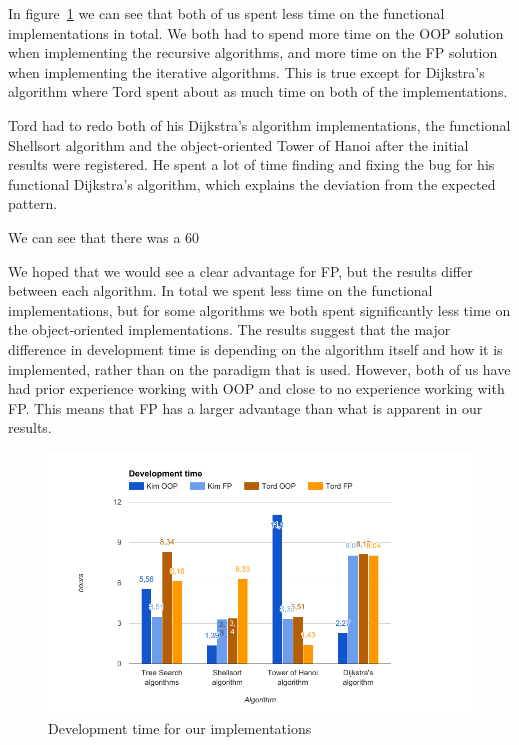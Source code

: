 \documentclass {article}
\begin{document}
In figure~\ref{fig:development-time-graph} we can see that both of us spent less time on the functional implementations in total. We both had to spend more time on the OOP solution when implementing the recursive algorithms, and more time on the FP solution when implementing the iterative algorithms. This is true except for Dijkstra's algorithm where Tord spent about as much time on both of the implementations. 
 
Tord had to redo both of his Dijkstra's algorithm implementations, the functional Shellsort algorithm and the object-oriented Tower of Hanoi after the initial results were registered. He spent a lot of time finding and fixing the bug for his functional Dijkstra's algorithm, which explains the deviation from the expected pattern.
 
We can see that there was a 60%
 
We hoped that we would see a clear advantage for FP, but the results differ between each algorithm. In total we spent less time on the functional implementations, but for some algorithms we both spent significantly less time on the object-oriented implementations. The results suggest that the major difference in development time is depending on the algorithm itself and how it is implemented, rather than on the paradigm that is used. However, both of us have had prior experience working with OOP and close to no experience working with FP. This means that FP has a larger advantage than what is apparent in our results. 
 
\begin{figure}[H]
\centering
\includegraphics[width=\textwidth]{development-time-graph}

\caption{Development time for our implementations}
\label{fig:development-time-graph}
\end{figure}
\end{document}
